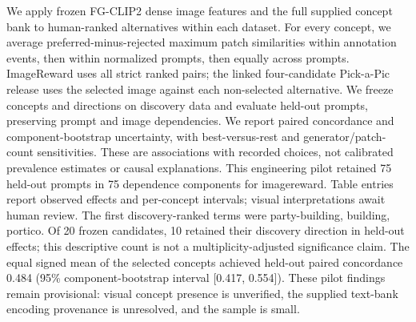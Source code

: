 We apply frozen FG-CLIP2 dense image features and the full supplied concept bank to human-ranked alternatives within each dataset. For every concept, we average preferred-minus-rejected maximum patch similarities within annotation events, then within normalized prompts, then equally across prompts. ImageReward uses all strict ranked pairs; the linked four-candidate Pick-a-Pic release uses the selected image against each non-selected alternative. We freeze concepts and directions on discovery data and evaluate held-out prompts, preserving prompt and image dependencies. We report paired concordance and component-bootstrap uncertainty, with best-versus-rest and generator/patch-count sensitivities. These are associations with recorded choices, not calibrated prevalence estimates or causal explanations. This engineering pilot retained 75 held-out prompts in 75 dependence components for imagereward. Table entries report observed effects and per-concept intervals; visual interpretations await human review.
The first discovery-ranked terms were party-building, building, portico. Of 20 frozen candidates, 10 retained their discovery direction in held-out effects; this descriptive count is not a multiplicity-adjusted significance claim. The equal signed mean of the selected concepts achieved held-out paired concordance 0.484 (95\% component-bootstrap interval [0.417, 0.554]). These pilot findings remain provisional: visual concept presence is unverified, the supplied text-bank encoding provenance is unresolved, and the sample is small.
